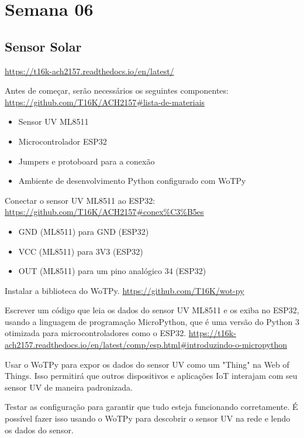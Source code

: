 
\section{Semana 06}

\subsection{Sensor Solar}

\url{https://t16k-ach2157.readthedocs.io/en/latest/}

Antes de começar, serão necessários os seguintes componentes:
\url{https://github.com/T16K/ACH2157#lista-de-materiais}
\begin{itemize}
    \item Sensor UV ML8511
    \item Microcontrolador ESP32
    \item Jumpers e protoboard para a conexão
    \item Ambiente de desenvolvimento Python configurado com WoTPy
\end{itemize}

Conectar o sensor UV ML8511 ao ESP32: 
\url{https://github.com/T16K/ACH2157#conex%C3%B5es}
\begin{itemize}
    \item GND (ML8511) para GND (ESP32)
    \item VCC (ML8511) para 3V3 (ESP32)
    \item OUT (ML8511) para um pino analógico 34 (ESP32)
\end{itemize}

Instalar a biblioteca do WoTPy.
\url{https://github.com/T16K/wot-py}

Escrever um código que leia os dados do sensor UV ML8511 e os exiba no ESP32, usando a linguagem de programação MicroPython, que é uma versão do Python 3 otimizada para microcontroladores como o ESP32.
\url{https://t16k-ach2157.readthedocs.io/en/latest/comp/esp.html#introduzindo-o-micropython}

Usar o WoTPy para expor os dados do sensor UV como um "Thing" na Web of Things. Isso permitirá que outros dispositivos e aplicações IoT interajam com seu sensor UV de maneira padronizada.

Testar as configuração para garantir que tudo esteja funcionando corretamente. É possível fazer isso usando o WoTPy para descobrir o sensor UV na rede e lendo os dados do sensor.

